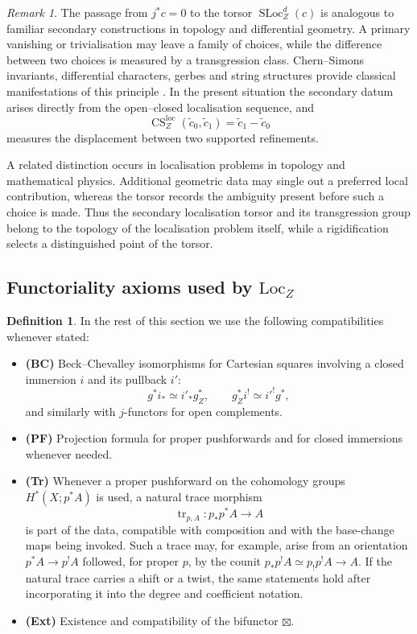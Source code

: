 \documentclass[10pt,a4paper,dvipsnames,x11names]{amsart}
\newcommand{\Loc}{\mathrm{Loc}}
\newcommand{\SLoc}{\operatorname{SLoc}}
\newcommand{\CSLoc}{\operatorname{CS}^{\mathrm{loc}}}
\numberwithin{equation}{section}
\theoremstyle{plain}
\theoremstyle{definition}
\newtheorem{definition}[definition]{Definition}
\theoremstyle{remark}
\newtheorem{remark}[remark]{Remark}
\begin{document}
\begin{remark}\label{rem:secondary-analogies}
The passage from $j^*c=0$ to the torsor $\SLoc_Z^d(c)$ is analogous to familiar secondary constructions in topology and differential geometry. A primary vanishing or trivialisation may leave a family of choices, while the difference between two choices is measured by a transgression class. Chern--Simons invariants, differential characters, gerbes and string structures provide classical manifestations of this principle \cite{ChernSimons,CheegerSimons,BrylinskiMcLaughlinI,BrylinskiMcLaughlinII,HopkinsSinger,WaldorfString}. In the present situation the secondary datum arises directly from the open--closed localisation sequence, and
\[
\CSLoc_Z(\widetilde c_0,\widetilde c_1)
=
\widetilde c_1-\widetilde c_0
\]
measures the displacement between two supported refinements.

A related distinction occurs in localisation problems in topology and mathematical physics. Additional geometric data may single out a preferred local contribution, whereas the torsor records the ambiguity present before such a choice is made. Thus the secondary localisation torsor and its transgression group belong to the topology of the localisation problem itself, while a rigidification selects a distinguished point of the torsor.
\end{remark}

\subsection{Functoriality axioms used by \texorpdfstring{$\Loc_Z$}{LocZ}}

\begin{definition} \label{def:Loc-func-axioms}
In the rest of this section we use the following compatibilities whenever stated:
\begin{itemize}
\item \textbf{(BC)} Beck--Chevalley isomorphisms for Cartesian squares involving a closed immersion $i$ and its pullback $i'$:
$$
g^*i_*\simeq i'_*g_Z^*,
\qquad
g_Z^*i^!\simeq i'^!g^*,
$$
and similarly with $j$-functors for open complements.
\item \textbf{(PF)} Projection formula for proper pushforwards and for closed immersions whenever needed.
\item \textbf{(Tr)} Whenever a proper pushforward on the cohomology groups $H^*(X;p^*A)$ is used, a natural trace morphism
\[
\operatorname{tr}_{p,A}:p_*p^*A\longrightarrow A
\]
is part of the data, compatible with composition and with the base-change maps being invoked.  Such a trace may, for example, arise from an orientation $p^*A\to p^!A$ followed, for proper $p$, by the counit $p_*p^!A\simeq p_!p^!A\to A$.  If the natural trace carries a shift or a twist, the same statements hold after incorporating it into the degree and coefficient notation.
\item \textbf{(Ext)} Existence and compatibility of the bifunctor $\boxtimes$.
\end{itemize}
\end{definition}
\end{document}
